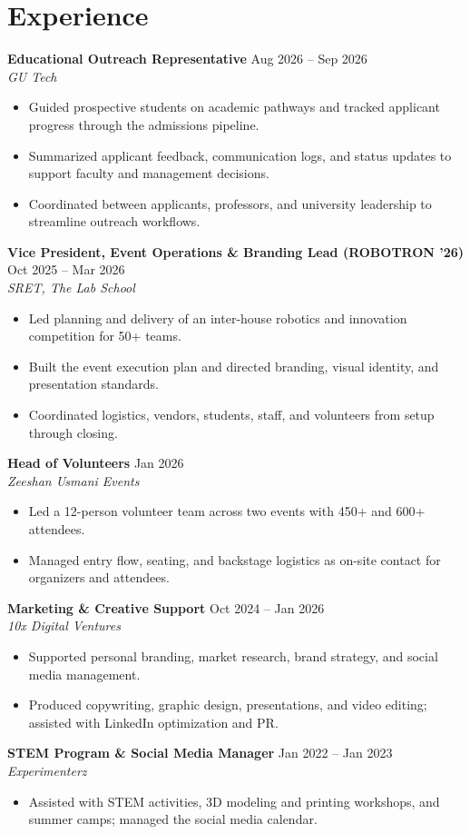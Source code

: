 \documentclass[10pt,a4paper]{article}
\newcommand{\entry}[4]{%
  \vspace{2pt}\textbf{#1} \hfill {\small #2}\\
  \textit{#3} \hfill {\small\textit{#4}}\par}
\begin{document}
\section{Experience}
\entry{Educational Outreach Representative}{Aug 2026 -- Sep 2026}{GU Tech}{}
  \begin{itemize}
    \item Guided prospective students on academic pathways and tracked applicant progress through the admissions pipeline.
    \item Summarized applicant feedback, communication logs, and status updates to support faculty and management decisions.
    \item Coordinated between applicants, professors, and university leadership to streamline outreach workflows.
  \end{itemize}
\entry{Vice President, Event Operations \& Branding Lead (ROBOTRON '26)}{Oct 2025 -- Mar 2026}{SRET, The Lab School}{}
  \begin{itemize}
    \item Led planning and delivery of an inter-house robotics and innovation competition for 50+ teams.
    \item Built the event execution plan and directed branding, visual identity, and presentation standards.
    \item Coordinated logistics, vendors, students, staff, and volunteers from setup through closing.
  \end{itemize}
\entry{Head of Volunteers}{Jan 2026}{Zeeshan Usmani Events}{}
  \begin{itemize}
    \item Led a 12-person volunteer team across two events with 450+ and 600+ attendees.
    \item Managed entry flow, seating, and backstage logistics as on-site contact for organizers and attendees.
  \end{itemize}
\entry{Marketing \& Creative Support}{Oct 2024 -- Jan 2026}{10x Digital Ventures}{}
  \begin{itemize}
    \item Supported personal branding, market research, brand strategy, and social media management.
    \item Produced copywriting, graphic design, presentations, and video editing; assisted with LinkedIn optimization and PR.
  \end{itemize}
\entry{STEM Program \& Social Media Manager}{Jan 2022 -- Jan 2023}{Experimenterz}{}
  \begin{itemize}
    \item Assisted with STEM activities, 3D modeling and printing workshops, and summer camps; managed the social media calendar.
  \end{itemize}
\end{document}
